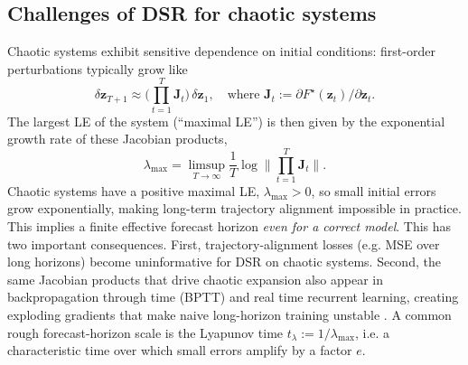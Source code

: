 \documentclass[twoside]{article}
\theoremstyle{plain}
\theoremstyle{definition}
\theoremstyle{remark}
\begin{document}
\subsection{Challenges of DSR for chaotic systems}
Chaotic systems exhibit sensitive dependence on initial conditions: first-order perturbations typically grow like
\begin{equation}
\label{eq:a0:lyap_growth}
\delta\bm z_{T+1} \approx \big(\prod_{t=1}^{T} \bm J_t\big)\,\delta\bm z_1, \quad \text{where } \bm J_t := \partial F^{\star}(\bm z_t)/\partial \bm z_t.
\end{equation}
The largest LE of the system (``maximal LE'') is then given by the exponential growth rate of these Jacobian products,
\begin{equation}
	\lambda_{\max} = \limsup_{T\to\infty}\frac{1}{T}\log\|\prod_{t=1}^{T}\bm J_t\|.
\end{equation}
Chaotic systems have a positive maximal LE, $\lambda_{\max}>0$, so small initial errors grow exponentially, making long-term trajectory alignment impossible in practice. This implies a finite effective forecast horizon \emph{even for a correct model}. This has two important consequences. First, trajectory-alignment losses (e.g. MSE over long horizons) become uninformative for DSR on chaotic systems. Second, the same Jacobian products that drive chaotic expansion also appear in backpropagation through time (BPTT) and real time recurrent learning, creating exploding gradients that make naive long-horizon training unstable \citep{mikhaeil2022chaosrnn}. A common rough forecast-horizon scale is the Lyapunov time $t_\lambda:=1/\lambda_{\max}$, i.e. a characteristic time over which small errors amplify by a factor $e$.
\end{document}
